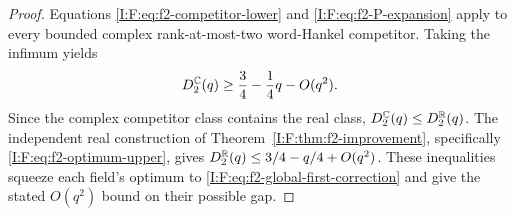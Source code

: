 \begin{proof}
Equations \eqref{I:F:eq:f2-competitor-lower} and
\eqref{I:F:eq:f2-P-expansion} apply to every bounded complex rank-at-most-two
word-Hankel competitor.  Taking the infimum yields
\[
 D_2^{\mathbb C}(q)\ge\frac34-\frac14q-O(q^2).
\]
Since the complex competitor class contains the real class,
$D_2^{\mathbb C}(q)\le D_2^{\mathbb R}(q)$.  The independent real construction of
Theorem~\ref{I:F:thm:f2-improvement}, specifically
\eqref{I:F:eq:f2-optimum-upper}, gives
$D_2^{\mathbb R}(q)\le3/4-q/4+O(q^2)$.  These inequalities squeeze each field's
optimum to \eqref{I:F:eq:f2-global-first-correction} and give the stated
$O(q^2)$ bound on their possible gap.
\end{proof}
